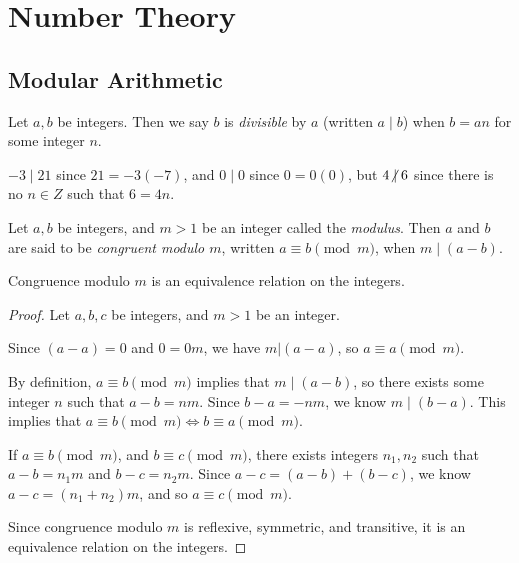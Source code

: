 
\chapter{Number Theory}
\label{ch:numbers}

\section{Modular Arithmetic}

\begin{defn}\label{divisible}
    Let $a, b$ be integers. Then we say $b$ is \emph{divisible} by $a$ (written $a \mid b$) when $b = an$ for some integer $n$.
\end{defn}

\begin{exmp} $-3 \mid 21$ since $21 = -3(-7)$, and $0 \mid 0$ since $0 = 0(0)$, but $4 \centernot\mid 6$ since there is no $n \in Z$ such that $6 = 4n$.
\end{exmp}

\begin{defn}\label{modular-congruence}
    Let $a, b$ be integers, and $m > 1$ be an integer called the \emph{modulus}. Then $a$ and $b$ are said to be \emph{congruent modulo $m$}, written $a \equiv b \pmod m$, when $m\mid(a - b)$.
\end{defn}

\begin{thm}\label{modular-congruence-equivalence}
    Congruence modulo $m$ is an equivalence relation on the integers.
\end{thm}

\begin{proof} Let $a, b, c$ be integers, and $m > 1$ be an integer.

    Since $(a-a) = 0$ and $0 = 0m$, we have $m|(a-a)$, so $a \equiv a \pmod m$.

    By definition, $a \equiv b \pmod m$ implies that $m\mid(a - b)$, so there exists some integer $n$ such that $a - b = nm$. Since $b - a = -nm$, we know $m\mid(b-a)$. This implies that $a \equiv b \pmod m \iff b \equiv a \pmod m$.

    If $a \equiv b \pmod m$, and $b \equiv c \pmod m$, there exists integers $n_1, n_2$ such that $a-b = n_1m$ and $b-c = n_2m$. Since $a-c = (a-b) + (b-c)$, we know $a-c = (n_1 + n_2)m$, and so $a \equiv c \pmod m$.

    Since congruence modulo $m$ is reflexive, symmetric, and transitive, it is an equivalence relation on the integers.
\end{proof}

